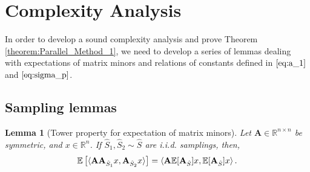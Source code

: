 \documentclass[11pt]{article}
\newcommand{\peter}[1]{\todo[inline]{{\textbf{Peter:} \emph{#1}}}}
\newcommand{\mojmir}[2]{\todo[inline]{{\textbf{Mojmir:} \emph{#1}}}}
\newtheorem{lemma}{Lemma}
\newcommand{\bA}{\mathbf{A}}
\newcommand{\bB}{\mathbf{B}}
\newcommand{\bX}{\mathbf{X}}
\begin{document}
	\section{Complexity Analysis}
	In order to develop a sound complexity analysis and prove Theorem \ref{theorem:Parallel_Method_1}, we need to develop a series of lemmas dealing with expectations of matrix minors and relations of constants defined in $\eqref{eq:a_1}$ and $\eqref{eq:sigma_p}$.

	\subsection{Sampling lemmas}
	
	
	\begin{lemma}[Tower property for expectation of matrix minors]
		Let $\bA \in \mathbb{R}^{n \times n}$ be symmetric, and $x \in \mathbb{R}^n$. If $\hat{S}_1, \hat{S}_2\sim \hat{S}$ are i.i.d. samplings, then,
		\begin{equation}\label{eq:tower_prop}
			\mathbb{E}\left[\braket{\bA \bA_{\hat{S}_1}x,\bA_{\hat{S}_2}x}\right]=\braket{\bA\mathbb{E}[\bA_{\hat{S}}]x,\mathbb{E}[\bA_{\hat{S}}]x}.
		\end{equation}
	\end{lemma} 
	
\end{document}
